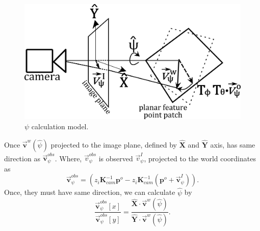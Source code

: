 \documentclass[annual]{acmsiggraph}
\begin{document}
\begin{figure}[h]
\center
\includegraphics[width = 0.8\columnwidth]{images/rotCalc.png}
\caption{$\psi$ calculation model.}
\label{img:psiCalc}
\end{figure}
%


Once $\vec{\mathbf{v}}^w(\hat{\psi})$ projected to the image plane, defined by $\hat{\mathbf{X}}$ and $\hat{\mathbf{Y}}$ axis, has same direction as $\vec{\mathbf{v}}_{\psi}^{obs}$. Where, $\vec{v}_{\psi}^{obs}$ is observed $\vec{v}_{\psi}^I$, projected to the world coordinates as 
\begin{equation}
\vec{\mathbf{v}}_{\psi}^{obs} = (z_{i}\mathbf{K}_{cam}^{-1}\mathbf{p}^o - z_{i}\mathbf{K}_{cam}^{-1}(\mathbf{p}^o + \vec{\mathbf{v}}_{\psi}^I)).
\end{equation}
Once, they must have same direction, we can calculate $\hat{\psi}$ by
\begin{equation}
\frac{ \vec{\mathbf{v}}_{\psi}^{obs}[x]}{ \vec{\mathbf{v}}_{\psi}^{obs}[y]} = \frac{\hat{\mathbf{X}} \cdot \vec{\mathbf{v}}^w(\hat{\psi})}{\hat{\mathbf{Y}} \cdot \vec{\mathbf{v}}^w(\hat{\psi})}.
\label{eq:psiCalc}
\end{equation}
\end{document}
